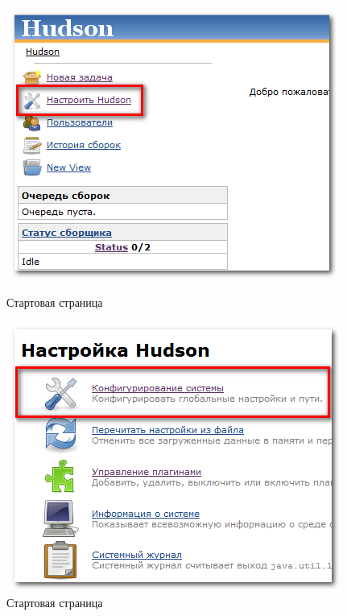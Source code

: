 \documentclass[a4paper,12pt]{article}
\begin{document}
\begin{figure}[htp]
	\begin{minipage}[h]{1\linewidth}
		\begin{center}
			\begin{minipage}[h]{0.49\linewidth}
				\begin{center}
				  \includegraphics[scale = 0.8]{conf-1.png}
				  \caption{Стартовая страница}
				  \label{pic.hudson.configuration}
				\end{center}
			\end{minipage}
			\hfill
			\begin{minipage}[h]{0.49\linewidth}
				\begin{center}
					\includegraphics[scale = 0.8]{conf-2.png}
					\caption{Стартовая страница}
					\label{pic.hudson.configuration.system-options}
				\end{center}
			\end{minipage}

\end{center}
\end{minipage}
\end{figure}
\end{document}
